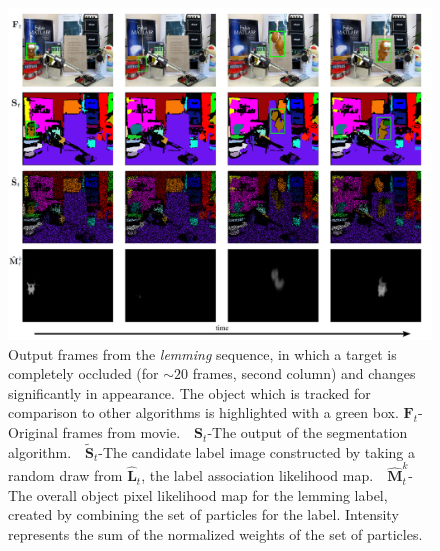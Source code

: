 \begin{figure}[!t]
\includegraphics[width=\linewidth]{figures/ECCV2012/Tracking.pdf}
  \caption[Tracked output from lemming sequence]{Output frames from the \textit{lemming} sequence, in which a target is completely occluded (for $\sim20$ frames, second column) and changes significantly in appearance. The object which is tracked for comparison to other algorithms is highlighted with a green box. $\mathbf{F}_t$-Original frames from  movie.~~$\mathbf{S}_t$-The output of the segmentation algorithm.~~$\tilde{\mathbf{S}}_{t}$-The candidate label image constructed by taking a random draw from $\hat{\mathbf{L}}_{t}$, the label association likelihood map.~~$\hat{\mathbf{M}}^k_{t}$-The overall object pixel likelihood map for the lemming label, created by combining the set of particles for the label. Intensity represents the sum of the normalized weights of the set of particles.}
\label{fig:Results}
\end{figure}

